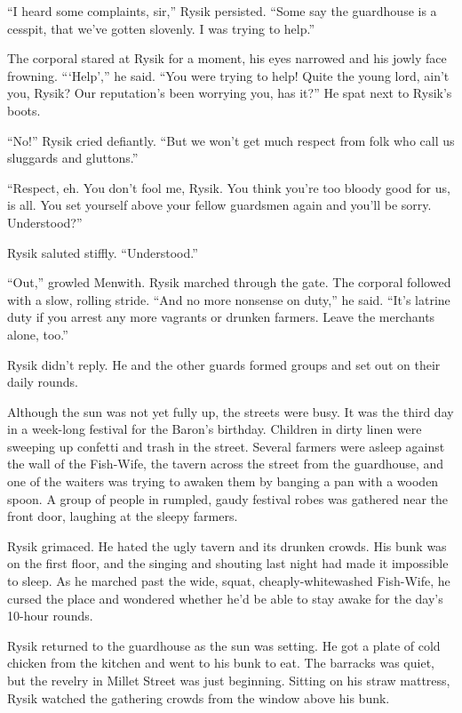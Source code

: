 \documentclass[10pt,b5paper]{article}
\begin{document}
``I heard some complaints, sir,'' Rysik persisted. ``Some say the
guardhouse is a cesspit, that we've gotten slovenly. I was trying
to help.''

The corporal stared at Rysik for a moment, his eyes narrowed and
his jowly face frowning. ```Help','' he said. ``You were trying to
help! Quite the young lord, ain't you, Rysik? Our reputation's been
worrying you, has it?'' He spat next to Rysik's boots.

``No!'' Rysik cried defiantly. ``But we won't get much respect from
folk who call us sluggards and gluttons.''

``Respect, eh. You don't fool me, Rysik. You think you're too bloody
good for us, is all. You set yourself above your fellow guardsmen
again and you'll be sorry. Understood?''

Rysik saluted stiffly. ``Understood.''

``Out,'' growled Menwith. Rysik marched through the gate. The corporal
followed with a slow, rolling stride. ``And no more nonsense on
duty,'' he said. ``It's latrine duty if you arrest any more vagrants
or drunken farmers. Leave the merchants alone, too.''

Rysik didn't reply. He and the other guards formed groups and set
out on their daily rounds.

Although the sun was not yet fully up, the streets were busy. It
was the third day in a week-long festival for the Baron's birthday.
Children in dirty linen were sweeping up confetti and trash in
the street. Several farmers were asleep against the wall of the
Fish-Wife, the tavern across the street from the guardhouse, and
one of the waiters was trying to awaken them by banging a pan with
a wooden spoon. A group of people in rumpled, gaudy festival robes
was gathered near the front door, laughing at the sleepy farmers.

Rysik grimaced. He hated the ugly tavern and its drunken crowds.
His bunk was on the first floor, and the singing and shouting last
night had made it impossible to sleep. As he marched past the
wide, squat, cheaply-whitewashed Fish-Wife, he cursed the place
and wondered whether he'd be able to stay awake for the day's
10-hour rounds.

\bigskip

Rysik returned to the guardhouse as the sun was setting. He got a
plate of cold chicken from the kitchen and went to his bunk to eat.
The barracks was quiet, but the revelry in Millet Street was just
beginning. Sitting on his straw mattress, Rysik watched the gathering
crowds from the window above his bunk.
\end{document}
